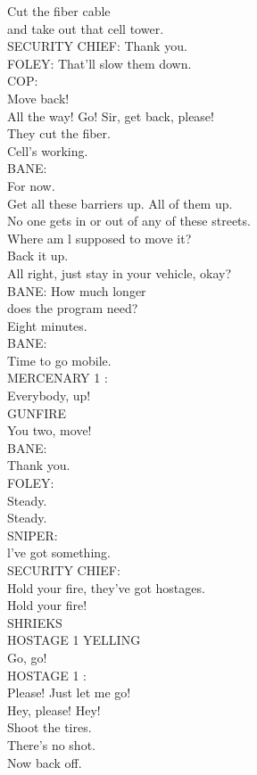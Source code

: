 \documentclass{article}
\begin{document}
\begin{multicols}{3}
Cut the fiber cable\\
and take out that cell tower.\\
SECURITY CHIEF: Thank you.\\
FOLEY: That'll slow them down.\\
COP:\\
Move back!\\
All the way! Go! Sir, get back, please!\\
They cut the fiber.\\
Cell's working.\\
BANE:\\
For now.\\
Get all these barriers up. All of them up.\\
No one gets in or out of any of these streets.\\
Where am l supposed to move it?\\
Back it up.\\
All right, just stay in your vehicle, okay?\\
BANE: How much longer\\
does the program need?\\
Eight minutes.\\
BANE:\\
Time to go mobile.\\
MERCENARY 1 :\\
Everybody, up!\\
GUNFIRE\\
You two, move!\\
BANE:\\
Thank you.\\
FOLEY:\\
Steady.\\
Steady.\\
SNIPER:\\
l've got something.\\
SECURITY CHIEF:\\
Hold your fire, they've got hostages.\\
Hold your fire!\\
SHRIEKS\\
HOSTAGE 1 YELLING\\
Go, go!\\
HOSTAGE 1 :\\
Please! Just let me go!\\
Hey, please! Hey!\\
Shoot the tires.\\
There's no shot.\\
Now back off.\\

\end{multicols}
\end{document}
